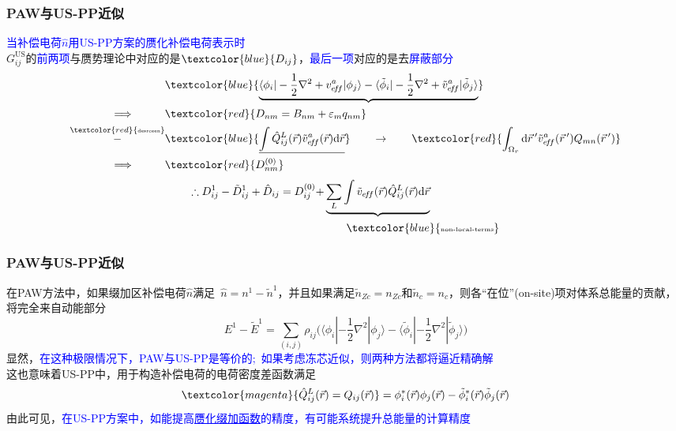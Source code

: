 {\frame
{
	\frametitle{\textrm{PAW}与\textrm{US-PP}近似}
	\textcolor{blue}{当补偿电荷$\hat n$用\textrm{US-PP}方案的赝化补偿电荷表示时}\\%
	$G_{ij}^{\mathrm{US}}$的\textcolor{blue}{前两项}与赝势理论中对应的是$\textcolor{blue}{D_{ij}}$，\textcolor{blue}{最后一项}对应的是去\textcolor{blue}{屏蔽部分}
	\begin{displaymath}
		\begin{aligned}
			&\textcolor{blue}{\underbrace{\langle\phi_i|-\frac12\nabla^2+v_{e\!f\!f}^a|\phi_j\rangle-\langle\tilde\phi_i|-\frac12\nabla^2+\tilde v_{e\!f\!f}^a|\tilde\phi_j\rangle}}\\
			\Longrightarrow\quad\qquad&\textcolor{red}{D_{nm}=B_{nm}+\varepsilon_mq_{nm}} \\
			\overset{\textcolor{red}{\textrm{\fontsize{4.1pt}{3.9pt}\selectfont{desrceen}}}}{-}&\textcolor{blue}{\underline{\int\hat Q_{ij}^L(\vec r)\tilde v_{e\!f\!f}^a(\vec r)\mathrm{d}\vec r}} \qquad\rightarrow\qquad \textcolor{red}{\int_{\Omega_r}\mathrm{d}\vec r\,^{\prime}\tilde v_{e\!f\!f}^a(\vec r\,^{\prime})Q_{mn}(\vec r\,^{\prime})}\\
			\Longrightarrow\quad\qquad&\textcolor{red}{D_{nm}^{(0)}}
		\end{aligned}
	\end{displaymath}
	\begin{displaymath}
		\begin{aligned}
			\therefore D_{ij}^1-\tilde D_{ij}^1+\hat D_{ij}=D_{ij}^{(0)}+&\underbrace{\sum_L\int\tilde v_{e\!f\!f}(\vec r)\hat{Q}_{ij}^L(\vec r)\mathrm{d}\vec r}\\
			&\qquad{\textcolor{blue}{\fontsize{5.2pt}{4.2pt}\selectfont{\textrm{non-local-terms}}}}
		\end{aligned}
	\end{displaymath}
}

\frame
{
	\frametitle{\textrm{PAW}与\textrm{US-PP}近似}
	在\textrm{PAW}方法中，如果缀加区补偿电荷$\hat n$满足~$\hat n=n^1-\tilde n^1$，并且如果满足$\tilde n_{Zc}=n_{Zc}$和$\tilde n_c=n_c$，则各“在位”(\textrm{on-site})项对体系总能量的贡献，将完全来自动能部分
	\begin{displaymath}
		E^1-\tilde E^1=\sum_{(i,j)}\rho_{ij}\big(\langle\phi_i|-\frac12\nabla^2|\phi_j\rangle-\langle\tilde\phi_i|-\frac12\nabla^2|\tilde\phi_j\rangle\big)
	\end{displaymath}
	显然，\textcolor{blue}{在这种极限情况下，\textrm{PAW}与\textrm{US-PP}是等价的;~如果考虑冻芯近似，则两种方法都将逼近精确解}\\ 
	这也意味着\textrm{US-PP}中，用于构造补偿电荷的电荷密度差函数满足
	$$\textcolor{magenta}{\hat Q_{ij}^L(\vec r)=Q_{ij}(\vec r)}=\phi_i^{\ast}(\vec r)\phi_j(\vec r)-\tilde\phi_i^{\ast}(\vec r)\tilde\phi_j(\vec r)$$
	由此可见，\textcolor{blue}{在\textrm{US-PP}方案中，如能提高\underline{赝化缀加函数}的精度，有可能系统提升总能量的计算精度}

}}
